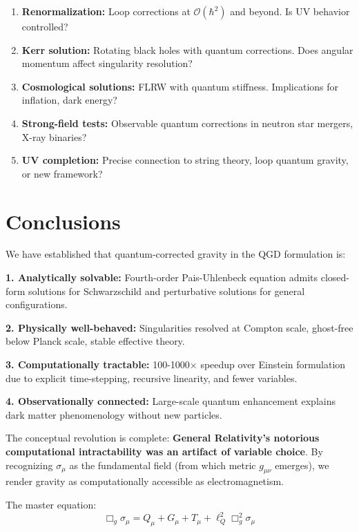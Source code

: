 \documentclass[11pt,a4paper]{article}
\theoremstyle{definition}
\theoremstyle{remark}
\begin{document}
	\begin{enumerate}
		\item \textbf{Renormalization:} Loop corrections at $\mathcal{O}(\hbar^2)$ and beyond. Is UV behavior controlled?
		
		\item \textbf{Kerr solution:} Rotating black holes with quantum corrections. Does angular momentum affect singularity resolution?
		
		\item \textbf{Cosmological solutions:} FLRW with quantum stiffness. Implications for inflation, dark energy?
		
		\item \textbf{Strong-field tests:} Observable quantum corrections in neutron star mergers, X-ray binaries?
		
		\item \textbf{UV completion:} Precise connection to string theory, loop quantum gravity, or new framework?
	\end{enumerate}
	
	\section{Conclusions}
	
	We have established that quantum-corrected gravity in the QGD formulation is:
	
	\textbf{1. Analytically solvable:} Fourth-order Pais-Uhlenbeck equation admits closed-form solutions for Schwarzschild and perturbative solutions for general configurations.
	
	\textbf{2. Physically well-behaved:} Singularities resolved at Compton scale, ghost-free below Planck scale, stable effective theory.
	
	\textbf{3. Computationally tractable:} 100-1000× speedup over Einstein formulation due to explicit time-stepping, recursive linearity, and fewer variables.
	
	\textbf{4. Observationally connected:} Large-scale quantum enhancement explains dark matter phenomenology without new particles.
	
	The conceptual revolution is complete: \textbf{General Relativity's notorious computational intractability was an artifact of variable choice}. By recognizing $\sigma_\mu$ as the fundamental field (from which metric $g_{\mu\nu}$ emerges), we render gravity as computationally accessible as electromagnetism.
	
	The master equation:
	\begin{equation}
		\boxed{\Box_g\sigma_\mu = Q_\mu + G_\mu + T_\mu + \ell_Q^2\Box_g^2\sigma_\mu}
	\end{equation}
	
\end{document}
